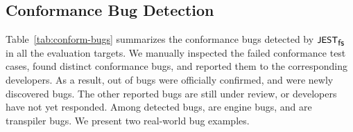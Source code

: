 

\subsection{Conformance Bug Detection}\label{sec:conform-bug}


Table~\ref{tab:conform-bugs} summarizes the conformance bugs
detected by $\textsf{\small JEST}_{\textsf{\small fs}}$ in all the evaluation targets.
We manually inspected the failed conformance test cases,
found  distinct conformance bugs, and reported them to
the corresponding developers.
%
As a result,  out of  bugs were officially confirmed, and
 were newly discovered bugs.
%
The other  reported bugs are still under review, or developers have
not yet responded.
%
Among  detected bugs,  are engine bugs, and  are
transpiler bugs.
We present two real-world bug examples.


